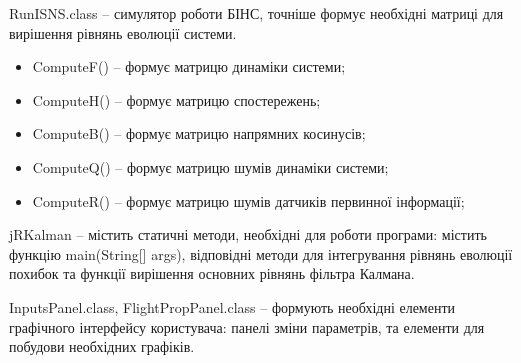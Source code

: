 RunISNS.class -- симулятор роботи БІНС, точніше формує необхідні матриці для вирішення рівнянь еволюції системи. 
\begin{itemize}
 \item ComputeF() -- формує матрицю динаміки системи;
 \item ComputeH() -- формує матрицю спостережень;
 \item ComputeB() -- формує матрицю напрямних косинусів;
 \item ComputeQ() -- формує матрицю шумів динаміки системи;
 \item ComputeR() -- формує матрицю шумів датчиків первинної інформації;
\end{itemize}

jRKalman -- містить статичні методи, необхідні для роботи програми: містить функцію main(String[] args), відповідні методи для інтегрування рівнянь еволюції похибок та функції вирішення основних рівнянь фільтра Калмана.

InputsPanel.class, FlightPropPanel.class -- формують необхідні елементи графічного інтерфейсу користувача: панелі зміни параметрів, та елементи для побудови необхідних графіків.

